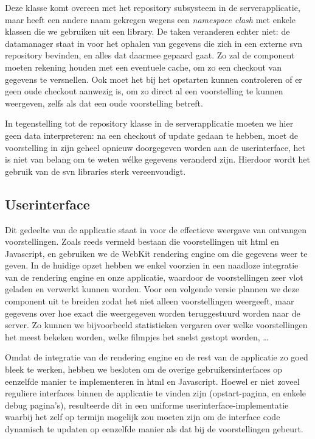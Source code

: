 Deze klasse komt overeen met het repository subsysteem in de serverapplicatie, maar heeft een andere naam gekregen wegens een \emph{namespace clash} met enkele klassen die we gebruiken uit een library. De taken veranderen echter niet: de datamanager staat in  voor het ophalen van gegevens die zich in een externe \ac{svn} repository bevinden, en alles dat daarmee gepaard gaat. Zo zal de component moeten rekening houden met een eventuele cache, om zo een checkout van gegevens te versnellen. Ook moet het bij het opstarten kunnen controleren of er geen oude checkout aanwezig is, om zo direct al een voorstelling te kunnen weergeven, zelfs als dat een oude voorstelling betreft.

In tegenstelling tot de repository klasse in de serverapplicatie moeten we hier geen data interpreteren: na een checkout of update gedaan te hebben, moet de voorstelling in zijn geheel opnieuw doorgegeven worden aan de userinterface, het is niet van belang om te weten wélke gegevens veranderd zijn. Hierdoor wordt het gebruik van de \ac{svn} libraries sterk vereenvoudigt.


\subsection{Userinterface}
\label{kiosk:structuur:userinterface}

Dit gedeelte van de applicatie staat in voor de effectieve weergave van ontvangen voorstellingen. Zoals reeds vermeld bestaan die voorstellingen uit \ac{html} en Javascript, en gebruiken we de WebKit rendering engine om die gegevens weer te geven. In de huidige opzet hebben we enkel voorzien in een naadloze integratie van de rendering engine en onze applicatie, waardoor de voorstellingen zeer vlot geladen en verwerkt kunnen worden. Voor een volgende versie plannen we deze component uit te breiden zodat het niet alleen voorstellingen weergeeft, maar gegevens over hoe exact die weergegeven worden teruggestuurd worden naar de server. Zo kunnen we bijvoorbeeld statistieken vergaren over welke voorstellingen het meest bekeken worden, welke filmpjes het snelst gestopt worden, \ldots

Omdat de integratie van de rendering engine en de rest van de applicatie zo goed bleek te werken, hebben we besloten om de overige gebruikersinterfaces op eenzelfde manier te implementeren in \ac{html} en Javascript. Hoewel er niet zoveel reguliere interfaces binnen de applicatie te vinden zijn (opstart-pagina, en enkele debug pagina's), resulteerde dit in een uniforme userinterface-implementatie waarbij het zelf op termijn mogelijk zou moeten zijn om de interface code dynamisch te updaten op eenzelfde manier als dat bij de voorstellingen gebeurt.

